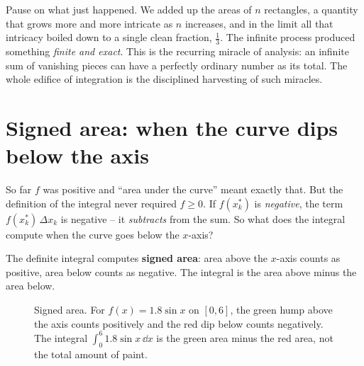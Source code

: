 \begin{aestheticbox}
Pause on what just happened. We added up the areas of $n$ rectangles, a quantity
that grows more and more intricate as $n$ increases, and in the limit all that
intricacy boiled down to a single clean fraction, $\tfrac13$. The infinite
process produced something \emph{finite and exact}. This is the recurring
miracle of analysis: an infinite sum of vanishing pieces can have a perfectly
ordinary number as its total. The whole edifice of integration is the
disciplined harvesting of such miracles.
\end{aestheticbox}

\section{Signed area: when the curve dips below the axis}
\label{ch20:signed-area}

So far $f$ was positive and ``area under the curve'' meant exactly that. But the
definition of the integral never required $f \ge 0$. If $f(x_k^\ast)$ is
\emph{negative}, the term $f(x_k^\ast)\,\Delta x_k$ is negative -- it
\emph{subtracts} from the sum. So what does the integral compute when the curve
goes below the $x$-axis?

\begin{focusbox}
The definite integral computes \textbf{signed area}: area above the $x$-axis
counts as positive, area below counts as negative. The integral is the area
above minus the area below.
\end{focusbox}

\begin{figure}[h]
\centering
{}
\caption{Signed area. For $f(x)=1.8\sin x$ on $[0,6]$, the green hump above the
axis counts positively and the red dip below counts negatively. The integral
$\int_0^6 1.8\sin x\,\dd x$ is the green area minus the red area, not the total
amount of paint.}
\label{ch20:fig-signed}
\end{figure}

